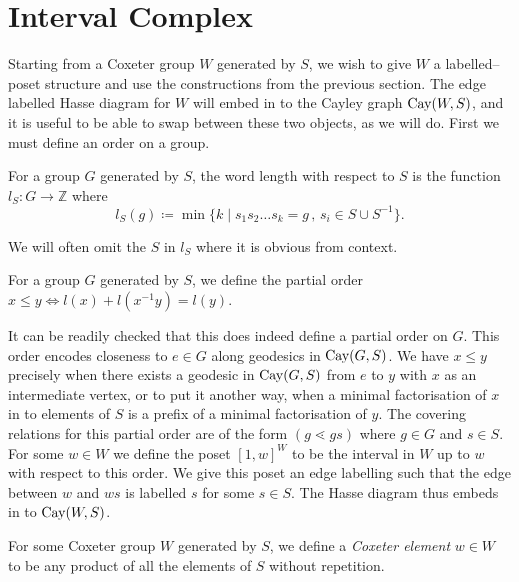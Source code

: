 \documentclass[class=article, crop=false]{standalone}
\begin{document}
\section{Interval Complex}
\label{sec:interval_cx}
Starting from a Coxeter group $W$ generated by $S$, we wish to give $W$ a labelled--poset structure and use the constructions from the previous section. The edge labelled Hasse diagram for $W$ will embed in to the Cayley graph $\text{Cay}(W,S)$, and it is useful to be able to swap between these two objects, as we will do. First we must define an order on a group.

\begin{definition}
    For a group $G$ generated by $S$, the word length with respect to $S$ is the function $l_S:G\to \mathbb{Z}$ where
    \begin{equation*}
        l_S(g) \coloneq \min\{k \mid s_1s_2\ldots s_k=g \,,\, s_i \in S \cup S^{-1}\}.
    \end{equation*}
\end{definition}
We will often omit the $S$ in $l_S$ where it is obvious from context.

\begin{definition}
    For a group $G$ generated by $S$, we define the partial order $x \leq y \iff l(x) + l(x^{-1}y) = l(y)$.
\end{definition}

It can be readily checked that this does indeed define a partial 
order on $G$. This order encodes closeness to $e \in G$ along geodesics in $\text{Cay}(G,S)$. We have $x \leq y$ precisely when there exists a geodesic in $\text{Cay}(G, S)$ from $e$ to $y$ with $x$ as an intermediate vertex, or to put it another way, when a minimal factorisation of $x$ in to elements of $S$ is a prefix of a minimal factorisation of $y$. The covering relations for this partial order are of the form $(g \lessdot gs)$ where $g \in G$ and $s \in S$.
For some $w \in W$ we define the poset $[1,w]^W$ to be the interval in $W$ up to $w$ with respect to this order. We give this poset an edge labelling such that the edge between $w$ and $ws$ is labelled $s$ for some $s \in S$. The Hasse diagram thus embeds in to $\text{Cay}(W,S)$.

\begin{definition}
	For some Coxeter group $W$ generated by $S$, we define a \emph{Coxeter element} $w\in W$ to be any product of all the elements of $S$ without repetition.
\end{definition}
\end{document}
